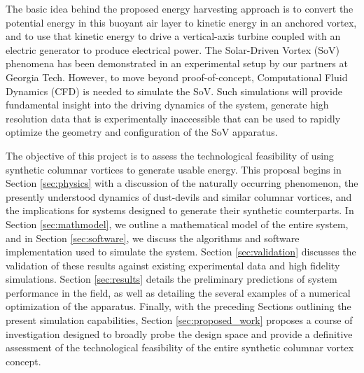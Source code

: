 The basic idea behind the proposed energy harvesting approach is to convert the 
potential energy in this buoyant air layer to kinetic energy in an
anchored vortex, and to use that kinetic energy to drive a
vertical-axis turbine coupled with an electric generator  to
produce electrical power. 
The Solar-Driven Vortex (SoV) phenomena has been demonstrated in
an experimental setup by our partners at Georgia Tech. However, to 
move beyond proof-of-concept, Computational Fluid 
Dynamics (CFD) is needed to simulate the SoV. Such simulations will
provide fundamental insight into the 
driving dynamics of the system, generate high resolution data that is 
experimentally inaccessible that can be used to rapidly optimize the
geometry and configuration of the SoV apparatus. 


%
%

The objective of this project is to assess the technological feasibility of 
using synthetic columnar vortices to generate usable energy. 
This proposal begins in Section \ref{sec:physics} with a discussion of the 
naturally occurring phenomenon, the presently understood dynamics of
dust-devils and similar columnar vortices, and the implications for systems
designed to generate their synthetic counterparts. 
In Section \ref{sec:mathmodel}, we outline a mathematical model of
the entire system, and in Section \ref{sec:software}, we discuss the
algorithms and software implementation used to simulate the
system. Section \ref{sec:validation} discusses the 
validation of these results against existing experimental data and high
fidelity simulations. Section \ref{sec:results} details the preliminary
predictions of system performance in the field, as well as detailing the 
several examples of a numerical optimization of the apparatus. Finally, with the 
preceding Sections outlining the present simulation capabilities, 
Section \ref{sec:proposed_work} proposes a course of investigation
designed to broadly probe the design space and provide a
definitive assessment of the technological feasibility of the entire 
synthetic columnar vortex concept. 


